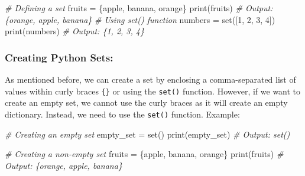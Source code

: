 \documentclass[11pt]{article}
\newenvironment{Shaded}{}{}
\newcommand{\DecValTok}[1]{\textcolor[rgb]{0.25,0.63,0.44}{{#1}}}
\newcommand{\StringTok}[1]{\textcolor[rgb]{0.25,0.44,0.63}{{#1}}}
\newcommand{\CommentTok}[1]{\textcolor[rgb]{0.38,0.63,0.69}{\textit{{#1}}}}
\newcommand{\NormalTok}[1]{{#1}}
\newcommand{\OperatorTok}[1]{\textcolor[rgb]{0.40,0.40,0.40}{{#1}}}
\newcommand{\BuiltInTok}[1]{{#1}}
\begin{document}
\begin{Shaded}
\begin{Highlighting}[]
\CommentTok{\# Defining a set}
\NormalTok{fruits }\OperatorTok{=}\NormalTok{ \{}\StringTok{\textquotesingle{}apple\textquotesingle{}}\NormalTok{, }\StringTok{\textquotesingle{}banana\textquotesingle{}}\NormalTok{, }\StringTok{\textquotesingle{}orange\textquotesingle{}}\NormalTok{\}}
\BuiltInTok{print}\NormalTok{(fruits) }\CommentTok{\# Output: \{\textquotesingle{}orange\textquotesingle{}, \textquotesingle{}apple\textquotesingle{}, \textquotesingle{}banana\textquotesingle{}\}}
\CommentTok{\# Using set() function}
\NormalTok{numbers }\OperatorTok{=} \BuiltInTok{set}\NormalTok{([}\DecValTok{1}\NormalTok{, }\DecValTok{2}\NormalTok{, }\DecValTok{3}\NormalTok{, }\DecValTok{4}\NormalTok{])}
\BuiltInTok{print}\NormalTok{(numbers) }\CommentTok{\# Output: \{1, 2, 3, 4\}}
\end{Highlighting}
\end{Shaded}

\hypertarget{creating-python-sets}{%
\subsubsection{Creating Python Sets:}\label{creating-python-sets}}

As mentioned before, we can create a set by enclosing a comma-separated
list of values within curly braces \texttt{\{\}} or using the
\texttt{set()} function. However, if we want to create an empty set, we
cannot use the curly braces as it will create an empty dictionary.
Instead, we need to use the \texttt{set()} function. Example:

\begin{Shaded}
\begin{Highlighting}[]
\CommentTok{\# Creating an empty set}
\NormalTok{empty\_set }\OperatorTok{=} \BuiltInTok{set}\NormalTok{()}
\BuiltInTok{print}\NormalTok{(empty\_set) }\CommentTok{\# Output: set()}

\CommentTok{\# Creating a non{-}empty set}
\NormalTok{fruits }\OperatorTok{=}\NormalTok{ \{}\StringTok{\textquotesingle{}apple\textquotesingle{}}\NormalTok{, }\StringTok{\textquotesingle{}banana\textquotesingle{}}\NormalTok{, }\StringTok{\textquotesingle{}orange\textquotesingle{}}\NormalTok{\}}
\BuiltInTok{print}\NormalTok{(fruits) }\CommentTok{\# Output: \{\textquotesingle{}orange\textquotesingle{}, \textquotesingle{}apple\textquotesingle{}, \textquotesingle{}banana\textquotesingle{}\}}
\end{Highlighting}
\end{Shaded}
\end{document}
